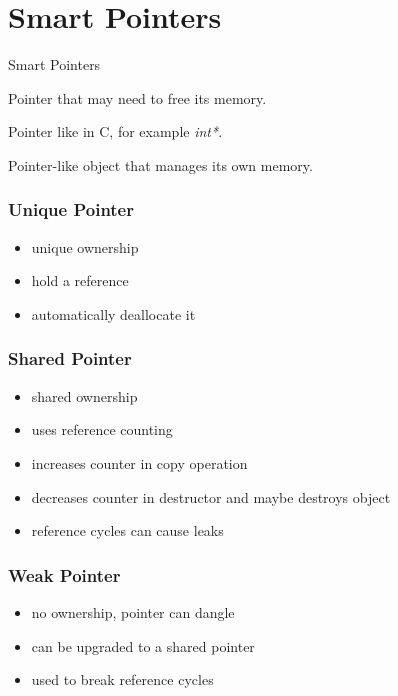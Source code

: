\documentclass[xcolor=colortbl
]{beamer}
\begin{document}
\section{Smart Pointers}

\begin{frame}{Smart Pointers}
    \begin{definition}
        Pointer that may need to free its memory.
    \end{definition}
    \begin{definition}
        Pointer like in C, for example \emph{int*}.
    \end{definition}
    \begin{definition}
        Pointer-like object that manages its own memory.
    \end{definition}
\end{frame}

\begin{frame}
    \frametitle{Unique Pointer}
    
    
    \begin{itemize}
        \item unique ownership
        \item hold a reference
        \item automatically deallocate it
    \end{itemize}
\end{frame}

\begin{frame}
    \frametitle{Shared Pointer}
  
    \begin{itemize}
        \item shared ownership
        \item uses reference counting
        \item increases counter in copy operation
        \item decreases counter in destructor and maybe destroys object
        \item reference cycles can cause leaks
    \end{itemize}
\end{frame}

\begin{frame}
    \frametitle{Weak Pointer}
    
    \begin{itemize}
        \item no ownership, pointer can dangle
        \item can be upgraded to a shared pointer
        \item used to break reference cycles
    \end{itemize}
\end{frame}
\end{document}
